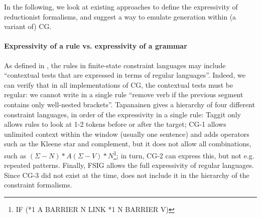 In the following, we look at existing approaches to define the expressivity of reductionist formalisms, 
and suggest a way to emulate generation within (a variant of) CG.




\paragraph{Expressivity of a rule vs. expressivity of a grammar}

As defined in \cite{tapanainen1999phd}, the rules in finite-state constraint languages may include ``contextual tests that are expressed in terms of regular languages''. 
Indeed, we can verify that in all implementations of CG, 
the contextual tests must be regular: we cannot write in a single rule ``remove verb if the previous segment contains only well-nested brackets''.
Tapanainen gives a hierarchy of four different constraint languages, in order of the expressivity in a single rule: Taggit \cite{taggit} only allows rules to look at 1-2 tokens before or after the target; CG-1 \cite{karlsson1990cgp} allows unlimited context within the window (usually one sentence) and adds operators such as the Kleene star and complement, but it does not allow all combinations, such as $(\Sigma - N)*A(\Sigma - V)*N$\footnote{IF (*1 A BARRIER N LINK *1 N BARRIER V)}; in turn, CG-2 \cite{tapanainen1996} can express this, but not e.g. repeated patterns. Finally, FSIG \cite{koskenniemi90} allows the full expressivity of regular languages. Since CG-3 \cite{bick2015} did not exist at the time, \cite{tapanainen1999phd} does not include it in the hierarchy of the constraint formalisms.

